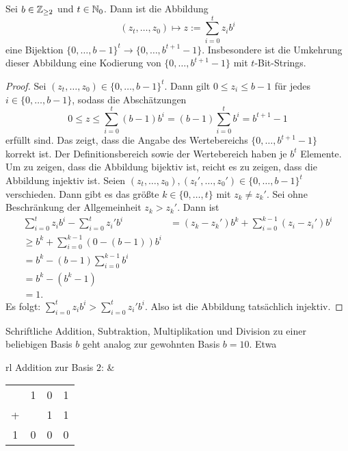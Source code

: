 \begin{prop}
	Sei $b \in \mathbb{Z}_{\ge 2}$ und $t \in \mathbb{N}_0$. Dann ist die Abbildung 
	\begin{equation}
	(z_t,\ldots,z_0) \mapsto z:= \sum_{i=0}^t z_i b^i
	\end{equation}
	eine Bijektion $\{0,\ldots,b-1\}^t \to \{0,\ldots,b^{t+1} -1\}$. Insbesondere ist die Umkehrung dieser Abbildung eine Kodierung von $\{0,\ldots,b^{t+1} -1\}$ mit $t$-Bit-Strings. 
\end{prop} 
\begin{proof}
 Sei $(z_t,\ldots,z_0) \in \{0,\ldots,b-1\}^t$. Dann gilt $0 \le z_i  \le b-1$ für jedes $i  \in \{0,\ldots,b-1\}$, sodass die Abschätzungen
 \[
 	0 \le z \le \sum_{i=0}^t (b-1) b^i = (b-1) \sum_{i=0}^t b^i = b^{t+1} -1
 \]
 erfüllt sind. Das zeigt, dass die Angabe des Wertebereichs $\{0,\ldots,b^{t+1} -1\}$ korrekt ist.
 Der Definitionsbereich sowie der Wertebereich haben je $b^t$ Elemente. Um zu zeigen, dass die Abbildung bijektiv ist, reicht es zu zeigen, dass die Abbildung injektiv ist. Seien $(z_t,\ldots,z_0), (z_t',\ldots,z_0') \in \{0,\ldots,b-1\}^t$ verschieden. Dann gibt es das größte $k\in \{0,\ldots,t\}$ mit $z_k \ne z_k'$. Sei ohne Beschränkung der Allgemeinheit $z_k>z_k'$. Dann ist 
 \begin{align*}
 		\sum_{i=0}^t z_i b^i - \sum_{i=0}^t z_i' b^i & = (z_k - z_k')b^k + \sum_{i=0}^{k-1} (z_i -z_i') b^i
 		\\ \ge b^k + \sum_{i=0}^{k-1} (0 - (b-1)) b^i 
 		\\ = b^k - (b-1) \sum_{i=0}^{k-1} b^i
 		\\ = b^k - (b^k - 1) 
 		\\ =1.
 \end{align*}
Es folgt: $\sum_{i=0}^t z_i b^i > \sum_{i=0}^t z_i' b^i $. Also ist die Abbildung tatsächlich injektiv. 
\end{proof} 


\begin{bsp}
	Schriftliche Addition, Subtraktion, Multiplikation und Division zu einer beliebigen Basis $b$ geht analog zur gewohnten Basis $b=10$. Etwa
	\begin{center}
		\begin{tabular}{rl}
			Addition zur Basis $2$:\hspace{3em} &
			\begin{tabular}{cccc}
				& 1 & 0 & 1
				\\	+ & & 1 & 1
				\\ \hline
				1 & 0 & 0 & 0
			\end{tabular}
		\end{tabular}
	\end{center}
\end{bsp}

